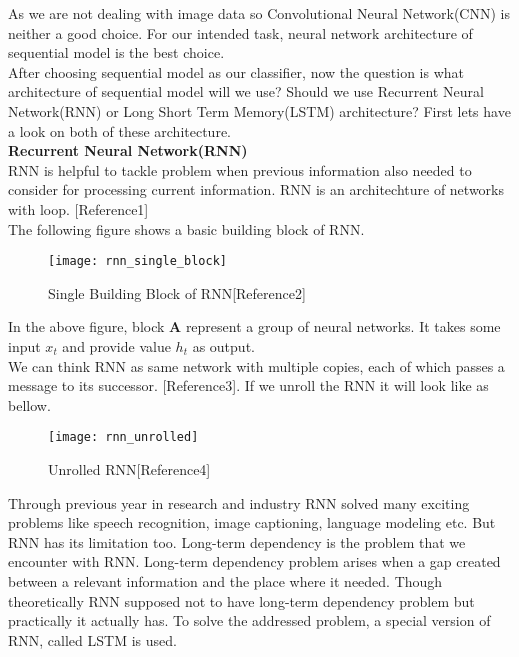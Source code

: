 As we are not dealing with image data so Convolutional Neural Network(CNN) is neither a good choice. For our intended task, neural network architecture of sequential model is the best choice. \\

After choosing sequential model as our classifier, now the question is what architecture of sequential model will we use? Should we use Recurrent Neural Network(RNN) or Long Short Term Memory(LSTM) architecture? First lets have a look on both of these architecture. \\

\textbf{Recurrent Neural Network(RNN)} \\
RNN is helpful to tackle problem when previous information also needed to consider for processing current information. RNN is an architechture of networks with loop. [Reference1] \\

The following figure shows a basic building block of RNN. \\

\begin{figure}[h]
    \centering
    \texttt{[image: rnn\_single\_block]}
    \caption{Single Building Block of RNN[Reference2]}
\end{figure}
\vline

In the above figure, block $\textbf{A}$ represent a group of neural networks. It takes some input \textbf{$x_t$} and provide value \textbf{$h_t$} as output. \\

We can think RNN as same network with multiple copies, each of which passes a message to its successor. [Reference3]. If we unroll the RNN it will look like as bellow. \\

\begin{figure}[h]
    \centering
    \texttt{[image: rnn\_unrolled]}
    \caption{Unrolled RNN[Reference4]}
\end{figure}
\vline

Through previous year in research and industry RNN solved many exciting problems like speech recognition, image captioning, language modeling etc. But RNN has its limitation too. Long-term dependency is the problem that we encounter with RNN. Long-term dependency problem arises when a gap created between a relevant information and the place where it needed. Though theoretically RNN supposed not to have long-term dependency problem but practically it actually has. To solve the addressed problem, a special version of RNN, called LSTM is used. \\


